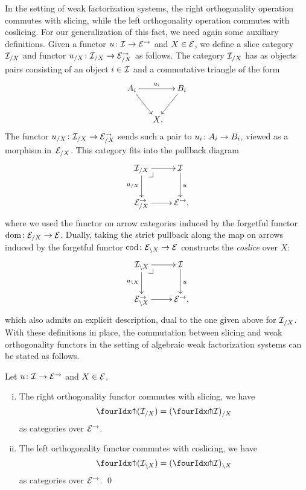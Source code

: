 \documentclass[reqno,10pt,a4paper,oneside,draft]{amsart}
\begin{document}
In the setting of weak factorization systems, the right orthogonality operation commutes with slicing, while the left orthogonality operation commutes with coslicing.
For our generalization of this fact, we need again some auxiliary definitions.
Given a functor $u \co \cal{I} \to \catE^\to$ and $X \in \catE$, we define a slice category $\cal{I}_{/X}$ and functor $u_{/X} \co \cal{I}_{/X} \to \catE_{/X}^\to$ as follows.
The category $\cal{I}_{/X}$ has as objects pairs consisting of an object $i \in \cal{I}$ and a commutative triangle of the form
\[
\xymatrix@C-1em{
  A_i
  \ar[dr]
  \ar[rr]^{u_i}
&&
  B_i
  \ar[dl]
\\&
  X
\rlap{.}}
\]
The functor $u_{/X} \co \cal{I}_{/X} \to \catE_{/X}^\to$ sends such a pair to $u_i \co A_i \to B_i$, viewed as a morphism in~$\catE_{/X}$.
This category fits into the pullback diagram
\[
\xymatrix{
  \cal{I}_{/X}
  \ar[r]
  \ar[d]_{u_{/X}}
  \pullback{dr}
&
  \cal{I}
  \ar[d]^{u}
\\
  \catE_{/X}^\to
  \ar[r]
&
  \catE^\to
\rlap{,}}
\]
where we used the functor on arrow categories induced by the forgetful functor $\dom \co \catE_{/X} \to \catE$.
Dually, taking the strict pullback along the map on arrows induced by the forgetful functor $\operatorname{cod} \co \catE_{\backslash X} \to \catE$ constructs the \emph{coslice} over $X$:
\[
\xymatrix{
  \cal{I}_{\backslash X}
  \ar[r]
  \ar[d]_{u_{\backslash X}}
  \pullback{dr}
&
  \cal{I}
  \ar[d]^{u}
\\
  \catE_{\backslash X}^\to
  \ar[r]
&
  \catE^\to
\rlap{,}}
\]
which also admits an explicit description, dual to the one given above for $\cal{I}_{/X}$.
With these definitions in place, the commutation between slicing and weak orthogonality functors in the setting of algebraic weak factorization systems can be stated as follows.

\begin{proposition} \label{pitchfork-slicing}
Let $u \co \cal{I} \to \catE^\to$ and $X \in \cal{E}$.
\begin{enumerate}[(i)]
\item The right orthogonality functor commutes with slicing, \ie we have
\[
  \liftr{(\cal{I}_{/X})} = (\liftr{\cal{I}})_{/X}
\]
as categories over $\catE^\to$.
\item The left orthogonality functor commutes with coslicing, \ie we have
\[
  \liftl{(\cal{I}_{\backslash X})} = (\liftl{\cal{I}})_{\backslash X}
\]
as categories over $\catE^\to$.
\qed
\end{enumerate}
\end{proposition}
\end{document}
